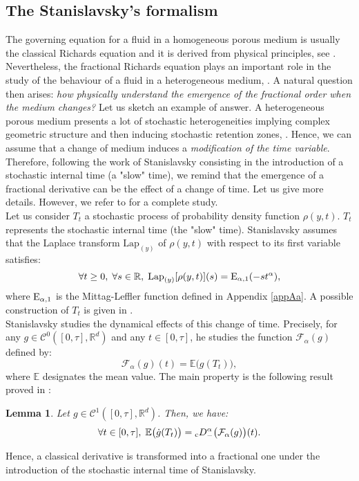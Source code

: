 \documentclass[english,11pt,reqno]{smfart}
\newtheorem{lemma}[theorem]{Lemma}
\newcommand{\R}{\mathbb{R}}
\newcommand{\CC}{\mathscr{C}}
\newcommand{\cDM}{{}_{{\rm c}} D^\alpha_-}
\begin{document}
\subsection{The Stanislavsky's formalism}\label{section31}
The governing equation for a fluid in a homogeneous porous medium is usually the classical Richards equation and it is derived from physical principles, see \cite{rich}. Nevertheless, the fractional Richards equation plays an important role in the study of the behaviour of a fluid in a heterogeneous medium, \cite{hilf,neel,neel2}. A natural question then arises: \textit{how physically understand the emergence of the fractional order when the medium changes?} Let us sketch an example of answer. A heterogeneous porous medium presents a lot of stochastic heterogeneities implying complex geometric structure and then inducing stochastic retention zones, \cite{neel}. Hence, we can assume that a change of medium induces a \textit{modification of the time variable}. Therefore, following the work of Stanislavsky consisting in the introduction of a stochastic internal time (a "slow" time), we remind that the emergence of a fractional derivative can be the effect of a change of time. Let us give more details. However, we refer to \cite{iniz,stan} for a complete study. \\

Let us consider $T_t$ a stochastic process of probability density function $\rho (y,t)$. $T_t$ represents the stochastic internal time (the "slow" time). Stanislavsky assumes that the Laplace transform $ \text{Lap}_{(y)}$ of $\rho (y,t)$ with respect to its first variable satisfies:
\begin{equation}
\forall t \geq 0, \; \forall s \in \R,\; \text{Lap}_{(y)} [\rho (y,t)](s)={\rm E}_{\alpha,1}(-st^\alpha),
\end{equation}
where ${\rm E}_{\alpha,1}$ is the Mittag-Leffler function defined in Appendix \ref{appAa}. A possible construction of $T_t$ is given in \cite{stan}. \\

Stanislavsky studies the dynamical effects of this change of time. Precisely, for any $g \in \CC^0([0,\tau],\R^d)$ and any $t \in [0,\tau]$, he studies the function $\mathcal{F}_\alpha (g)$ defined by:
\begin{equation}
\mathcal{F}_\alpha (g)(t) = \mathbb{E} \big( g(T_t) \big),
\end{equation}
where $\mathbb{E}$ designates the mean value. The main property is the following result proved in \cite{iniz,stan}:
\begin{lemma}\label{lemstan}
Let $g \in \CC^1([0,\tau],\R^d)$. Then, we have:
\begin{equation}
\forall t \in [0,\tau], \; \mathbb{E} \big( \dot{g} (T_t) \big) = \cDM \big( \mathcal{F}_\alpha (g) \big) (t).
\end{equation}
\end{lemma}
Hence, a classical derivative is transformed into a fractional one under the introduction of the stochastic internal time of Stanislavsky. 
\end{document}
